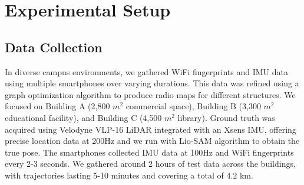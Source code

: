 \section{Experimental Setup}

\subsection{Data Collection}

In diverse campus environments, we gathered WiFi fingerprints and IMU data using multiple smartphones over varying durations. This data was refined using a graph optimization algorithm \cite{huaweiradiomap} to produce radio maps for different structures. We focused on Building A (2,800 $m^2$ commercial space), Building B (3,300 $m^2$ educational facility), and Building C (4,500 $m^2$ library). Ground truth was acquired using Velodyne VLP-16 LiDAR integrated with an Xsens IMU, offering precise location data at 200Hz and we run with Lio-SAM algorithm \cite{liosam2020shan} to obtain the true pose. The smartphones collected IMU data at 100Hz and WiFi fingerprints every 2-3 seconds. We gathered around 2 hours of test data across the buildings, with trajectories lasting 5-10 minutes and covering a total of $4.2$ km.



